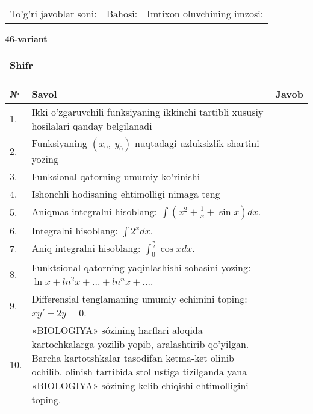 \documentclass{article}
\begin{document}
  \vspace{1cm}
  
  \begin{tabular}{lll}
  To'g'ri javoblar soni: \underline{\hspace{1.5cm}} & 
  Bahosi: \underline{\hspace{1.5cm}} & 
  Imtixon oluvchining imzosi: \underline{\hspace{2cm}} \\
  \end{tabular}
  
  \egroup
  
  \newpage
  
  
  \textbf{46-variant}\\
  
  \bgroup
  \def\arraystretch{1.6} %
  
  \begin{tabular}{|m{5.7cm}|m{9.5cm}|}
  \hline
  Shifr & \\
  \hline
  \end{tabular}
  
  \vspace{1cm}
  
  \begin{tabular}{|m{0.7cm}|m{10cm}|m{4cm}|}
  \hline
  № & Savol & Javob \\
  \hline
  1. & Ikki o'zgaruvchili funksiyaning ikkinchi tartibli xususiy hosilalari qanday belgilanadi &  \\
  \hline
  2. & Funksiyaning \((x_{0},\ y_{0})\) nuqtadagi uzluksizlik shartini yozing &  \\
  \hline
  3. & Funksional qatorning umumiy ko'rinishi &  \\
  \hline
  4. & Ishonchli hodisaning ehtimolligi nimaga teng &  \\
  \hline
  5. & Aniqmas integralni hisoblang: \(\int {\left( x^{2} + \frac{1}{x} + \sin x \right)dx}\). &  \\
  \hline
  6. & Integralni hisoblang: \(\int {2^{x}dx}\). &  \\
  \hline
  7. & Aniq integralni hisoblang: \(\int_{0}^{\frac{\pi}{2}}{\cos xdx}\). &  \\
  \hline
  8. & Funktsional qatorning yaqinlashishi sohasini yozing: \(\ln x + ln^{2}x + ... + ln^{n}x + ...\). &  \\
  \hline
  9. & Differensial tenglamaning umumiy echimini toping: \(xy' - 2y = 0\). &  \\
  \hline
  10. & «BIOLOGIYA» sózining harflari aloqida kartochkalarga yozilib yopib, aralashtirib qo'yilgan. Barcha kartotshkalar tasodifan ketma-ket olinib ochilib, olinish tartibida stol ustiga tizilganda yana «BIOLOGIYA» sózining kelib chiqishi ehtimolligini toping. &  \\
  \hline
  \end{tabular}
  
\end{document}
